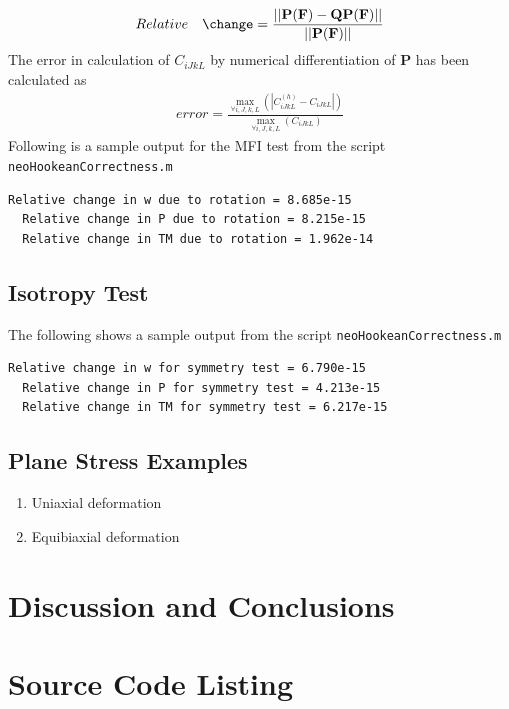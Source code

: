 \message{ !name(p2.tex)}\documentclass[../main.tex]{subfiles}
\begin{document}
\begin{align*}
  Relative\quad\change = \frac{||\mathbf{P}(\mathbf{F}) -\mathbf{Q}\mathbf{P}(\mathbf{F})||}{||\mathbf{P}(\mathbf{F})||}
\end{align*}
The error in calculation of $C_{iJkL}$ by numerical differentiation
of $\mathbf{P}$ has been calculated as
\begin{align*}
  error =\frac{\underset{\forall i,J,k,L}{\max}\left(|C^{(h)}_{iJkL}-C_{iJkL}|\right)}{\underset{\forall i,J,k,L}{\max}\left(C_{iJkL}\right)}
\end{align*}
Following is a sample output for the MFI test from the script \texttt{neoHookeanCorrectness.m}
\begin{lstlisting}[frame=single]
  Relative change in w due to rotation = 8.685e-15
  Relative change in P due to rotation = 8.215e-15
  Relative change in TM due to rotation = 1.962e-14
\end{lstlisting}

\subsection{Isotropy Test}

The following shows a sample output from the script \texttt{neoHookeanCorrectness.m}

\begin{lstlisting}[frame=single]
  Relative change in w for symmetry test = 6.790e-15
  Relative change in P for symmetry test = 4.213e-15
  Relative change in TM for symmetry test = 6.217e-15
\end{lstlisting}

\subsection{Plane Stress Examples}

\begin{enumerate}
\item Uniaxial deformation
\item Equibiaxial deformation
\end{enumerate}

\section{Discussion and Conclusions}


\section{Source Code Listing}
\end{document}
